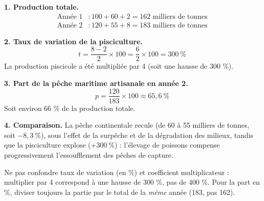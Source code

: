 \documentclass[11pt]{article}
\begin{document}
\begin{corrige}
\textbf{1. Production totale.}
\begin{align*}
\text{Année 1} &: 100 + 60 + 2 = 162 \text{ milliers de tonnes}\\
\text{Année 2} &: 120 + 55 + 8 = 183 \text{ milliers de tonnes}
\end{align*}

\textbf{2. Taux de variation de la pisciculture.}
\[
t = \frac{8 - 2}{2}\times 100 = \frac{6}{2}\times 100 = 300\ \%
\]
La production piscicole a été multipliée par 4 (soit une hausse de 300 \%).

\textbf{3. Part de la pêche maritime artisanale en année 2.}
\[
p = \frac{120}{183}\times 100 \approx 65,6\ \%
\]
Soit environ 66 \% de la production totale.

\textbf{4. Comparaison.} La pêche continentale recule (de 60 à 55 milliers de tonnes, soit $-8,3\ \%$), sous l'effet de la surpêche et de la dégradation des milieux, tandis que la pisciculture explose ($+300\ \%$) : l'élevage de poissons compense progressivement l'essoufflement des pêches de capture.

\begin{attention}
Ne pas confondre taux de variation (en \%) et coefficient multiplicateur : multiplier par 4 correspond à une hausse de 300 \%, pas de 400 \%. Pour la part en \%, diviser toujours la partie par le total de la \emph{même} année (183, pas 162).
\end{attention}
\end{corrige}
\end{document}
